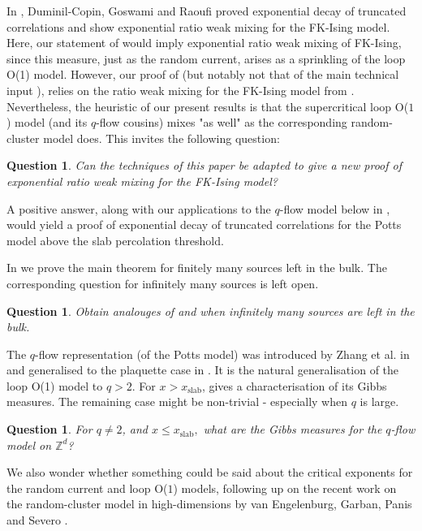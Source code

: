 \documentclass[article,11pt,reqno]{amsart}
\newcommand{\Z}{\mathbb{Z}}
\newtheorem{question}[theorem]{Question}
\begin{document}
In \cite{duminil2020exponential}, Duminil-Copin, Goswami and Raoufi proved exponential decay of truncated correlations and show exponential ratio weak mixing for the FK-Ising model. Here, our statement of  would imply exponential ratio weak mixing of FK-Ising, since this measure, just as the random current, arises as a sprinkling of the loop O(1) model. However, our proof of  (but notably not that of the main technical input ), relies on the ratio weak mixing for the FK-Ising model from \cite{duminil2020exponential}. Nevertheless, the heuristic of our present results is that the supercritical loop O($1$) model  (and its $q$-flow cousins) mixes "as well"  as the corresponding random-cluster model does. This invites the following question:
\begin{question}
Can the techniques of this paper be adapted to give a new proof of exponential ratio weak mixing for the FK-Ising model?
\end{question}
A positive answer, along with our applications to the $q$-flow model below in , would yield a proof of exponential decay of truncated correlations for the Potts model above the slab percolation threshold.

In  we prove the main theorem for finitely many sources left in the bulk. The corresponding question for infinitely many sources is left open.
\begin{question}
    Obtain analouges of  and  when infinitely many sources are left in the bulk. 
\end{question}


The $q$-flow representation (of the Potts model) was introduced by Zhang et al. in \cite{zhang2020loop} and generalised to the plaquette case in \cite{hansen2025general}. It is the natural generalisation of the loop O(1) model to $q>2$. For $x > x_{\text{slab}}$,   gives a characterisation of its Gibbs measures. The remaining case might be non-trivial - especially when $q$ is large.
 \begin{question}
     For $q\neq 2$, and $x \leq x_{\text{slab}},$ what are the Gibbs measures for the $q$-flow model on $\Z^d$?
 \end{question}
 We also wonder whether something could be said about the critical exponents for the random current and loop O($1$) models, following up on the recent work on the random-cluster model in high-dimensions by van Engelenburg, Garban, Panis and Severo \cite{vanengelenburg2025onearm}. 
 
\end{document}
